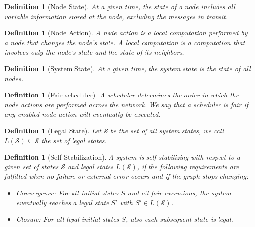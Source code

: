 \documentclass[a4paper,10pt,openany, oneside]{book}
\newtheorem{definition}[theorem]{Definition}
\begin{document}
\begin{definition}[Node State]
  \label{def:node_state}
  At a given time, the state of a node includes all variable
  information stored at the node, excluding the messages in
  transit.
\end{definition}


\begin{definition}[Node Action]
  \label{def:node_action}
  A node action is a local computation performed by a node that changes the node's state.
  A local computation is a computation that involves only the node's state and the state of its neighbors.
\end{definition}


\begin{definition}[System State]
  \label{def:system_state}
  At a given time, the system state is the state of all nodes.
\end{definition}

\begin{definition}[Fair scheduler]
  A scheduler determines the order in which the node actions are performed across the network.
  We say that a scheduler is \emph{fair} if any enabled node action will eventually be executed.
\end{definition}

\begin{definition}[Legal State]
  \label{def:legal_state}
  Let $\mathcal{S}$ be the set of all system states, we call $L(\mathcal{S}) \subseteq \mathcal{S}$ the set of \emph{legal} states.
\end{definition}



\begin{definition}[Self-Stabilization]
  \label{def:self-stabilization}
  A system is self-stabilizing with respect to a given set of states $\mathcal{S}$ and legal states $L(\mathcal{S})$, if the following requirements are fulfilled when no failure or external error occurs and if the graph stops changing:
  \begin{itemize}
  \item \emph{Convergence:}
    For all initial states $S$ and all fair executions, the system eventually reaches a legal state $S'$ with $S'\in L(\mathcal{S})$.

  \item \emph{Closure:}
    For all legal initial states $S$, also each subsequent state is legal.
  \end{itemize}
\end{definition}
\end{document}

